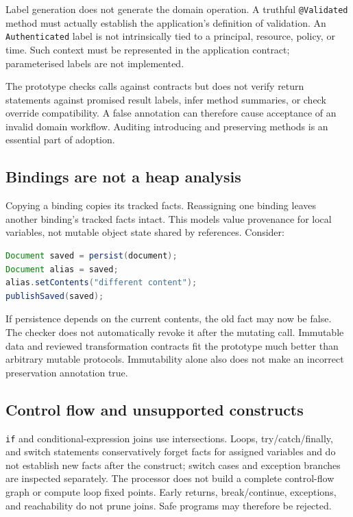 \documentclass[11pt]{article}
\begin{document}
Label generation does not generate the domain operation. A truthful
\texttt{@Validated} method must actually establish the application's definition
of validation. An \texttt{Authenticated} label is not intrinsically tied to a
principal, resource, policy, or time. Such context must be represented in the
application contract; parameterised labels are not implemented.

The prototype checks calls against contracts but does not verify return
statements against promised result labels, infer method summaries, or check
override compatibility. A false annotation can therefore cause acceptance of
an invalid domain workflow. Auditing introducing and preserving methods is an
essential part of adoption.

\subsection{Bindings are not a heap analysis}

Copying a binding copies its tracked facts. Reassigning one binding leaves
another binding's tracked facts intact. This models value provenance for local
variables, not mutable object state shared by references. Consider:
\begin{lstlisting}[language=Java]
Document saved = persist(document);
Document alias = saved;
alias.setContents("different content");
publishSaved(saved);
\end{lstlisting}
If persistence depends on the current contents, the old fact may now be false.
The checker does not automatically revoke it after the mutating call. Immutable
data and reviewed transformation contracts fit the prototype much better than
arbitrary mutable protocols. Immutability alone also does not make an incorrect
preservation annotation true.

\subsection{Control flow and unsupported constructs}

\texttt{if} and conditional-expression joins use intersections. Loops,
try/catch/finally, and switch statements conservatively forget facts for assigned
variables and do not establish new facts after the construct; switch cases and
exception branches are inspected separately. The processor does not build a
complete control-flow graph or compute loop fixed points. Early returns,
break/continue, exceptions, and reachability do not prune joins. Safe programs
may therefore be rejected.
\end{document}
